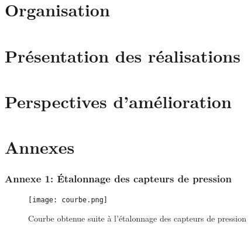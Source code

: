 \documentclass[12pt,fleqn]{book} %
\begin{document}
\part{Organisation}




\part{Présentation des réalisations}




\part{Perspectives d'amélioration}





\appendix
\part{Annexes}
 
\section{Annexe 1: Étalonnage des capteurs de pression}
 
\begin{figure}[h!]
\centering\texttt{[image: courbe.png]}
\caption{\label{fig:courbe} Courbe obtenue suite à l'étalonnage des capteurs de pression}
\end{figure}

\backmatter %

%
%
%
\end{document}
